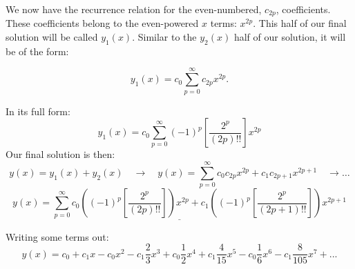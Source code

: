\documentclass[a4paper,12pt]{article}
\begin{document}
We now have the recurrence relation for the even-numbered, $c_{2p}$, coefficients. These coefficients belong to the even-powered $x$ terms: $x^{2p}$. This half of our final solution will be called $y_1(x)$. Similar to the $y_2(x)$ half of our solution, it will be of the form:

$$ y_1(x) = c_0 \sum_{p=0}^{\infty} c_{2p}x^{2p}. $$

In its full form:
$$ \boxed{y_1(x) = c_0 \sum_{p=0}^{\infty} (-1)^{p}\left[\frac{2^{p}}{(2p)!!}\right] x^{2p}} $$
Our final solution is then:
$$ y(x) = y_1(x) + y_2(x) \quad\rightarrow\quad y(x) = \sum_{p=0}^{\infty} c_0c_{2p}x^{2p} + c_1c_{2p+1}x^{2p+1} \quad\rightarrow\ldots $$
$$ \underline{\boxed{y(x) = \sum_{p=0}^{\infty} c_0\left( (-1)^{p}\left[\frac{2^{p}}{(2p)!!}\right]\right)x^{2p} + c_1\left((-1)^{p}\left[\frac{2^{p}}{(2p+1)!!}\right]\right)x^{2p+1}}}$$

Writing some terms out:
$$ y(x) = c_0 + c_1x -c_0x^2 - c_1\frac{2}{3}x^3 + c_0\frac{1}{2}x^4 + c_1\frac{4}{15}x^5-c_0\frac{1}{6}x^6-c_1\frac{8}{105}x^7+... $$
\end{document}
